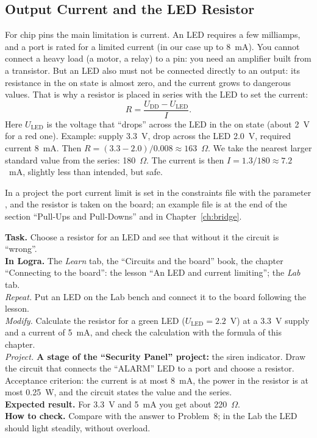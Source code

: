 \subsection{Output Current and the LED Resistor}

For chip pins the main limitation is current. An LED requires
a few milliamps, and a port is rated for a limited current (in our case
up to 8~mA). You cannot connect a heavy load (a motor, a relay) to a pin: you need
an amplifier built from a transistor. But an LED also must not be connected directly to an output:
its resistance in the on state is almost zero, and the current grows to
dangerous values. That is why a resistor is placed in series with the LED
to set the current:
\[
  R = \frac{U_\text{DD} - U_\text{LED}}{I}.
\]
Here $U_\text{LED}$ is the voltage that ``drops'' across the LED in the
on state (about 2~V for a red one). Example: supply 3.3~V, drop across the
LED 2.0~V, required current 8~mA. Then
$R = (3.3-2.0)/0.008 \approx 163$~$\Omega$. We take the nearest larger
standard value from the series: 180~$\Omega$. The current is then
$I = 1.3/180 \approx 7.2$~mA, slightly less than intended, but safe.

In a project the port current limit is set in the constraints file with the
parameter , and the resistor is taken on the board; an example
file is at the end of the section ``Pull-Ups and Pull-Downs'' and in
Chapter~\ref{ch:bridge}.

\begin{diybox}
\textbf{Task.} Choose a resistor for an LED and see that without
it the circuit is ``wrong''.\\
\textbf{In Logra.} The \emph{Learn} tab, the ``Circuits and the board'' book, the chapter
``Connecting to the board'': the lesson ``An LED and current limiting''; the
\emph{Lab} tab.\\
 \emph{Repeat.} Put an LED on the Lab bench and connect
it to the board following the lesson.\\
 \emph{Modify.} Calculate the resistor for a green LED
($U_\text{LED}=2.2$~V) at a 3.3~V supply and a current of 5~mA, and check the calculation
with the formula of this chapter.\\
 \emph{Project.} \textbf{A stage of the ``Security Panel'' project:} the
siren indicator. Draw the circuit that connects the ``ALARM'' LED to a port and choose a
resistor. Acceptance criterion: the current is at most 8~mA, the power in the resistor is at
most 0.25~W, and the circuit states the value and the series.\\
\textbf{Expected result.} For 3.3~V and 5~mA you get about 220~$\Omega$.\\
\textbf{How to check.} Compare with the answer to Problem~8; in the Lab the LED
should light steadily, without overload.
\end{diybox}

